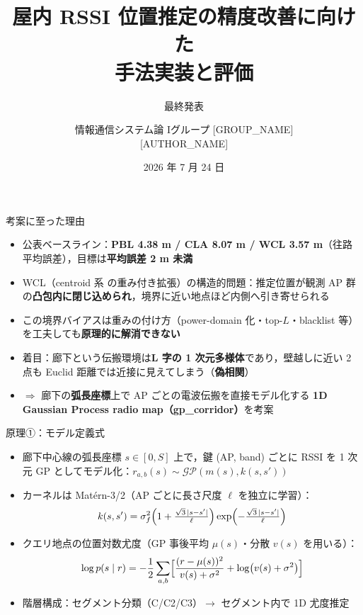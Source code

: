 \documentclass[aspectratio=169,unicode,10pt]{beamer}
\title{屋内 RSSI 位置推定の精度改善に向けた\\手法実装と評価}
\subtitle{最終発表}
\author{情報通信システム論 I\quad グループ [GROUP\_NAME]\\{[AUTHOR\_NAME]}}
\institute{}
\date{2026 年 7 月 24 日}
\begin{document}
\begin{frame}
  \titlepage
\end{frame}

\begin{frame}{考案に至った理由}
  \begin{itemize}
    \item 公表ベースライン：\textbf{PBL 4.38 m / CLA 8.07 m / WCL 3.57 m}（往路平均誤差）\cite{tanaka2023tut}，目標は\textbf{平均誤差 2 m 未満}
    \item WCL\cite{blumenthal2007wcl}（centroid 系\cite{bulusu2000gpsless} の重み付き拡張）の構造的問題：推定位置が観測 AP 群の\textbf{凸包内に閉じ込められ}，境界に近い地点ほど内側へ引き寄せられる\cite{ji2012vap}
    \item この境界バイアスは重みの付け方（power-domain 化・top-$L$・blacklist 等）を工夫しても\textbf{原理的に解消できない}
    \item 着目：廊下という伝搬環境は\textbf{L 字の 1 次元多様体}であり，壁越しに近い 2 点も Euclid 距離では近接に見えてしまう（\textbf{偽相関}）
    \item $\Rightarrow$ 廊下の\textbf{弧長座標}上で AP ごとの電波伝搬を直接モデル化する \textbf{1D Gaussian Process radio map（gp\_corridor）}を考案
  \end{itemize}
\end{frame}

\begin{frame}{原理①：モデル定義式}
  \begin{itemize}
    \item 廊下中心線の弧長座標 $s\in[0,S]$ 上で，鍵 (AP, band) ごとに RSSI を 1 次元 GP としてモデル化：$r_{a,b}(s)\sim\mathcal{GP}(m(s),k(s,s'))$
    \item カーネルは Matérn-3/2（AP ごとに長さ尺度 $\ell$ を独立に学習）：
    \[
      k(s,s')=\sigma_f^2\Bigl(1+\tfrac{\sqrt3\,|s-s'|}{\ell}\Bigr)\exp\Bigl(-\tfrac{\sqrt3\,|s-s'|}{\ell}\Bigr)
    \]
    \item クエリ地点の位置対数尤度（GP 事後平均 $\mu(s)$・分散 $v(s)$ を用いる）：
    \[
      \log p(s\mid r)=-\frac12\sum_{a,b}\Bigl[\frac{(r-\mu(s))^2}{v(s)+\sigma^2}+\log\bigl(v(s)+\sigma^2\bigr)\Bigr]
    \]
    \item 階層構成：セグメント分類（C/C2/C3）$\to$ セグメント内で 1D 尤度推定\cite{ferris2007gpslam}
  \end{itemize}
\end{frame}
\end{document}
